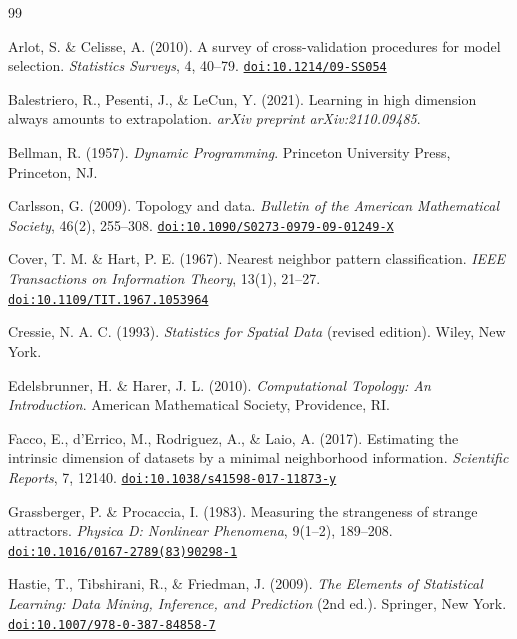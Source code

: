 \documentclass[12pt,a4paper]{article}
\providecommand{\doi}[1]{\href{https://doi.org/#1}{\texttt{doi:#1}}}
\begin{document}
\begin{thebibliography}{99}

Arlot, S. \& Celisse, A. (2010).
\newblock A survey of cross-validation procedures for model selection.
\newblock \emph{Statistics Surveys}, 4, 40--79.
\newblock \doi{10.1214/09-SS054}

Balestriero, R., Pesenti, J., \& LeCun, Y. (2021).
\newblock Learning in high dimension always amounts to extrapolation.
\newblock \emph{arXiv preprint arXiv:2110.09485}.

Bellman, R. (1957).
\newblock \emph{Dynamic Programming}.
\newblock Princeton University Press, Princeton, NJ.

Carlsson, G. (2009).
\newblock Topology and data.
\newblock \emph{Bulletin of the American Mathematical Society}, 46(2), 255--308.
\newblock \doi{10.1090/S0273-0979-09-01249-X}

Cover, T. M. \& Hart, P. E. (1967).
\newblock Nearest neighbor pattern classification.
\newblock \emph{IEEE Transactions on Information Theory}, 13(1), 21--27.
\newblock \doi{10.1109/TIT.1967.1053964}

Cressie, N. A. C. (1993).
\newblock \emph{Statistics for Spatial Data} (revised edition).
\newblock Wiley, New York.

Edelsbrunner, H. \& Harer, J. L. (2010).
\newblock \emph{Computational Topology: An Introduction}.
\newblock American Mathematical Society, Providence, RI.

Facco, E., d'Errico, M., Rodriguez, A., \& Laio, A. (2017).
\newblock Estimating the intrinsic dimension of datasets by a minimal
  neighborhood information.
\newblock \emph{Scientific Reports}, 7, 12140.
\newblock \doi{10.1038/s41598-017-11873-y}

Grassberger, P. \& Procaccia, I. (1983).
\newblock Measuring the strangeness of strange attractors.
\newblock \emph{Physica D: Nonlinear Phenomena}, 9(1--2), 189--208.
\newblock \doi{10.1016/0167-2789(83)90298-1}

Hastie, T., Tibshirani, R., \& Friedman, J. (2009).
\newblock \emph{The Elements of Statistical Learning: Data Mining, Inference,
  and Prediction} (2nd ed.).
\newblock Springer, New York.
\newblock \doi{10.1007/978-0-387-84858-7}


\end{thebibliography}
\end{document}
